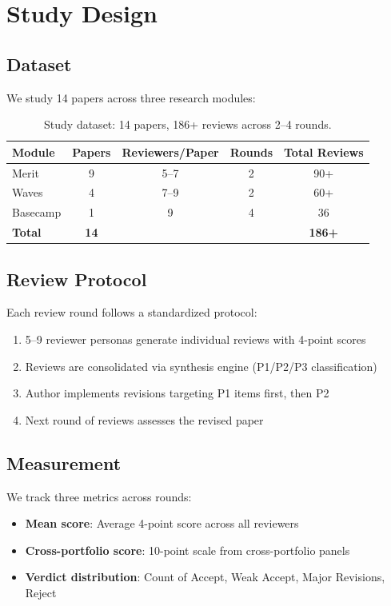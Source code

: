 \section{Study Design}

\subsection{Dataset}

We study 14 papers across three research modules:

\begin{table}[h]
\centering
\small
\begin{tabular}{lcccc}
\toprule
Module & Papers & Reviewers/Paper & Rounds & Total Reviews \\
\midrule
Merit & 9 & 5--7 & 2 & 90+ \\
Waves & 4 & 7--9 & 2 & 60+ \\
Basecamp & 1 & 9 & 4 & 36 \\
\midrule
\textbf{Total} & \textbf{14} & & & \textbf{186+} \\
\bottomrule
\end{tabular}
\caption{Study dataset: 14 papers, 186+ reviews across 2--4 rounds.}
\end{table}

\subsection{Review Protocol}

Each review round follows a standardized protocol:
\begin{enumerate}
    \item 5--9 reviewer personas generate individual reviews with 4-point scores
    \item Reviews are consolidated via synthesis engine (P1/P2/P3 classification)
    \item Author implements revisions targeting P1 items first, then P2
    \item Next round of reviews assesses the revised paper
\end{enumerate}

\subsection{Measurement}

We track three metrics across rounds:
\begin{itemize}
    \item \textbf{Mean score}: Average 4-point score across all reviewers
    \item \textbf{Cross-portfolio score}: 10-point scale from cross-portfolio panels
    \item \textbf{Verdict distribution}: Count of Accept, Weak Accept, Major Revisions, Reject
\end{itemize}
